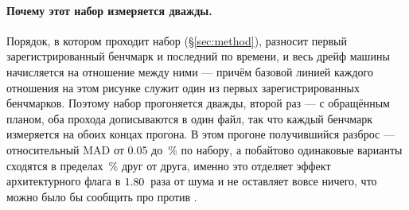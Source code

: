 \paragraph{Почему этот набор измеряется дважды.} Порядок, в котором  проходит набор
(\S\ref{sec:method}), разносит первый зарегистрированный бенчмарк и последний по времени, и весь
дрейф машины начисляется на отношение между ними ---
причём базовой линией каждого отношения на этом рисунке служит один из первых зарегистрированных
бенчмарков. Поэтому набор прогоняется дважды, второй раз --- с обращённым планом, оба прохода
дописываются в один файл, так что каждый бенчмарк измеряется на обоих концах прогона. В этом
прогоне получившийся разброс --- относительный MAD от 0.05 до \,\% по набору, а побайтово
одинаковые варианты сходятся в пределах \,\% друг от друга, именно это отделяет эффект
архитектурного флага в $\meas{ratio:b1_flags-314:matmul/O3native|b1_flags-314:matmul/O2}{1.80}$~раза от шума и не оставляет вовсе ничего, что можно было бы сообщить
про  против .

